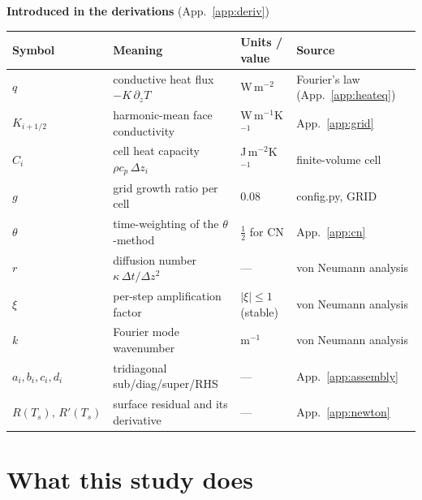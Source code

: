 \documentclass[11pt]{report}
\newcommand{\code}[1]{{\ttfamily\small #1}}
\begin{document}
\vspace{4pt}
\noindent\textbf{Introduced in the derivations} (App.~\ref{app:deriv})
\begin{center}\footnotesize
\begin{tabular}{@{}p{1.7cm}p{5.4cm}p{3.0cm}p{4.8cm}@{}}
\toprule
Symbol & Meaning & Units / value & Source \\
\midrule
$q$ & conductive heat flux $-K\,\partial_z T$ & W\,m$^{-2}$ & Fourier's law (App.~\ref{app:heateq}) \\
$K_{i+1/2}$ & harmonic-mean face conductivity & W\,m$^{-1}$K$^{-1}$ & App.~\ref{app:grid} \\
$C_i$ & cell heat capacity $\rho c_p\,\Delta z_i$ & J\,m$^{-2}$K$^{-1}$ & finite-volume cell \\
$g$ & grid growth ratio per cell & 0.08 & \code{config.py}, \code{GRID} \\
$\theta$ & time-weighting of the $\theta$-method & $\tfrac12$ for CN & App.~\ref{app:cn} \\
$r$ & diffusion number $\kappa\,\Delta t/\Delta z^2$ & --- & von Neumann analysis \\
$\xi$ & per-step amplification factor & $|\xi|\le1$ (stable) & von Neumann analysis \\
$k$ & Fourier mode wavenumber & m$^{-1}$ & von Neumann analysis \\
$a_i,b_i,c_i,d_i$ & tridiagonal sub/diag/super/RHS & --- & App.~\ref{app:assembly} \\
$R(T_s),\,R'(T_s)$ & surface residual and its derivative & --- & App.~\ref{app:newton} \\
\bottomrule
\end{tabular}
\end{center}
\clearpage

\chapter{What this study does}\label{ch:study}
\end{document}
